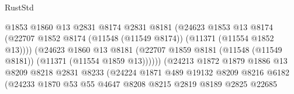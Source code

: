 \begin{lexlean}{RustStd}
\begin{coremodule}
                                          @1853
                                          @1860
                                          @13
                                          @2831
                                          @8174
                                          @2831
                                          @8181
                                          (@24623
                                            @1853
                                            @13
                                            @8174
                                            (@22707
                                              @1852
                                              @8174
                                              (@11548 (@11549 @8174))
                                              (@11371 (@11554 @1852 @13))))
                                          (@24623
                                            @1860
                                            @13
                                            @8181
                                            (@22707
                                              @1859
                                              @8181
                                              (@11548 (@11549 @8181))
                                              (@11371 (@11554 @1859 @13))))))
                                      (@24213
                                        @1872
                                        @1879
                                        @1886
                                        @13
                                        @8209
                                        @8218
                                        @2831
                                        @8233
                                        (@24224
                                          @1871
                                          @489
                                          @19132
                                          @8209
                                          @8216
                                          @6182
                                          (@24233
                                            @1870
                                            @53
                                            @55
                                            @4647
                                            @8208
                                            @8215
                                            @2819
                                            @8189
                                            @2825
                                            @22685

\end{coremodule}
\end{lexlean}
